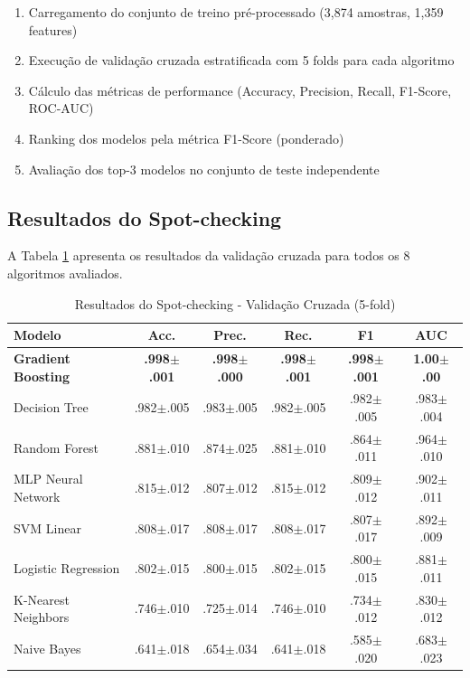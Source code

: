 \documentclass[12pt,a4paper]{article}
\begin{document}
\begin{enumerate}
    \item Carregamento do conjunto de treino pré-processado (3,874 amostras, 1,359 features)
    \item Execução de validação cruzada estratificada com 5 folds para cada algoritmo
    \item Cálculo das métricas de performance (Accuracy, Precision, Recall, F1-Score, ROC-AUC)
    \item Ranking dos modelos pela métrica F1-Score (ponderado)
    \item Avaliação dos top-3 modelos no conjunto de teste independente
\end{enumerate}

\subsection{Resultados do Spot-checking}

A Tabela \ref{tab:spotchecking} apresenta os resultados da validação cruzada para todos os 8 algoritmos avaliados.

\begin{table}[H]
\centering
\caption{Resultados do Spot-checking - Validação Cruzada (5-fold)}
\label{tab:spotchecking}
\footnotesize
\begin{tabular}{@{}lccccc@{}}
\toprule
\textbf{Modelo} & \textbf{Acc.} & \textbf{Prec.} & \textbf{Rec.} & \textbf{F1} & \textbf{AUC} \\
\midrule
\textbf{Gradient Boosting} & \textbf{.998$\pm$.001} & \textbf{.998$\pm$.000} & \textbf{.998$\pm$.001} & \textbf{.998$\pm$.001} & \textbf{1.00$\pm$.00} \\
Decision Tree & .982$\pm$.005 & .983$\pm$.005 & .982$\pm$.005 & .982$\pm$.005 & .983$\pm$.004 \\
Random Forest & .881$\pm$.010 & .874$\pm$.025 & .881$\pm$.010 & .864$\pm$.011 & .964$\pm$.010 \\
MLP Neural Network & .815$\pm$.012 & .807$\pm$.012 & .815$\pm$.012 & .809$\pm$.012 & .902$\pm$.011 \\
SVM Linear & .808$\pm$.017 & .808$\pm$.017 & .808$\pm$.017 & .807$\pm$.017 & .892$\pm$.009 \\
Logistic Regression & .802$\pm$.015 & .800$\pm$.015 & .802$\pm$.015 & .800$\pm$.015 & .881$\pm$.011 \\
K-Nearest Neighbors & .746$\pm$.010 & .725$\pm$.014 & .746$\pm$.010 & .734$\pm$.012 & .830$\pm$.012 \\
Naive Bayes & .641$\pm$.018 & .654$\pm$.034 & .641$\pm$.018 & .585$\pm$.020 & .683$\pm$.023 \\
\bottomrule
\end{tabular}
\end{table}
\end{document}
